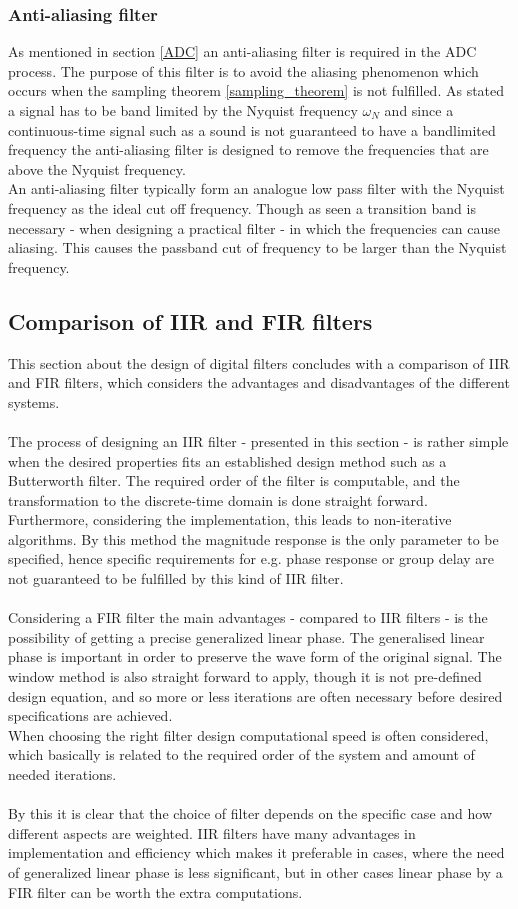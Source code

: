 \subsubsection{Anti-aliasing filter}
As mentioned in section \ref{ADC} an anti-aliasing filter is required in the ADC process. The purpose of this filter is to avoid the aliasing phenomenon which occurs when the sampling theorem \ref{sampling_theorem} is not fulfilled. As stated a signal has to be band limited by the Nyquist frequency $\omega_N$ and since a continuous-time signal such as a sound is not guaranteed to have a bandlimited frequency the anti-aliasing filter is designed to remove the frequencies that are above the Nyquist frequency. \\
An anti-aliasing filter typically form an analogue low pass filter with the Nyquist frequency as the ideal cut off frequency. Though as seen a transition band is necessary - when designing a practical filter - in which the frequencies can cause aliasing. This causes the passband cut of frequency to be larger than the Nyquist frequency.    
   
\subsection{Comparison of IIR and FIR filters}
This section about the design of digital filters concludes with a comparison of IIR and FIR filters, which considers the advantages and disadvantages of the different systems. \\ 
\\
The process of designing an IIR filter - presented in this section - is rather simple when the desired properties fits an established design method such as a Butterworth filter. The required order of the filter is computable, and the transformation to the discrete-time domain is done straight forward. Furthermore, considering the implementation, this leads to non-iterative algorithms. By this method the magnitude response is the only parameter to be specified, hence specific requirements for e.g. phase response or group delay are not guaranteed to be fulfilled by this kind of IIR filter. \\ \\
Considering a FIR filter the main advantages - compared to IIR filters - is the possibility of getting a precise generalized linear phase. The generalised linear phase is important in order to preserve the wave form of the original signal.  
The window method is also straight forward to apply, though it is not pre-defined design equation, and so more or less iterations are often necessary before desired specifications are achieved. \\
When choosing the right filter design computational speed is often considered, which basically is related to the required order of the system and amount of needed iterations. \\
\\
By this it is clear that the choice of filter depends on the specific case and how different aspects are weighted. IIR filters have many advantages in implementation and efficiency which makes it preferable in cases, where the need of generalized linear phase is less significant, but in other cases linear phase by a FIR filter can be worth the extra computations.